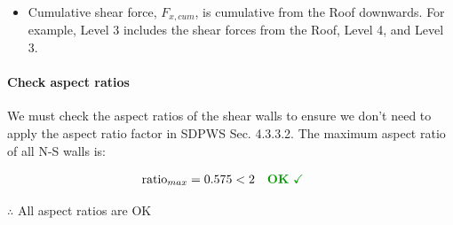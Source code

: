 \documentclass[11pt]{article}
\providecommand{\tightlist}{%
      \setlength{\itemsep}{0pt}\setlength{\parskip}{0pt}}
\def\lt{<}
\begin{document}
\begin{itemize}
\tightlist
\item
  Cumulative shear force, \(F_{x,cum}\), is cumulative from the Roof
  downwards. For example, Level 3 includes the shear forces from the
  Roof, Level 4, and Level 3.
\end{itemize}

    \paragraph{Check aspect ratios}\label{check-aspect-ratios}

We must check the aspect ratios of the shear walls to ensure we don't
need to apply the aspect ratio factor in SDPWS Sec. 4.3.3.2. The maximum
aspect ratio of all N-S walls is:

    \begin{equation*}
\begin{aligned}
\mathrm{ratio}_{max} &= 0.575 \lt 2 \quad \textbf{\color{OK}OK}\ {\color{OK}\checkmark} \; 
\end{aligned}
\end{equation*}

    
    \(\therefore\) All aspect ratios are OK
\end{document}
